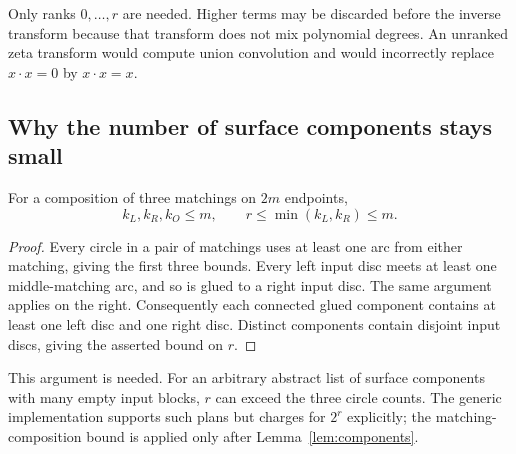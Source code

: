 Only ranks $0,\ldots,r$ are needed. Higher terms may be discarded before
the inverse transform because that transform does not mix polynomial
degrees. An unranked zeta transform would compute union convolution and
would incorrectly replace $x\cdot x=0$ by $x\cdot x=x$.

\subsection{Why the number of surface components stays small}

\begin{lemma}
\label{lem:components}
For a composition of three matchings on $2m$ endpoints,
\[
 k_L,k_R,k_O\leq m,
 \qquad r\leq\min(k_L,k_R)\leq m.
\]
\end{lemma}
\begin{proof}
Every circle in a pair of matchings uses at least one arc from either
matching, giving the first three bounds. Every left input disc meets at
least one middle-matching arc, and so is glued to a right input disc. The
same argument applies on the right. Consequently each connected glued
component contains at least one left disc and one right disc. Distinct
components contain disjoint input discs, giving the asserted bound on $r$.
\end{proof}

This argument is needed. For an arbitrary abstract list of surface
components with many empty input blocks, $r$ can exceed the three circle
counts. The generic implementation supports such plans but charges for
$2^r$ explicitly; the matching-composition bound is applied only after
Lemma~\ref{lem:components}.

